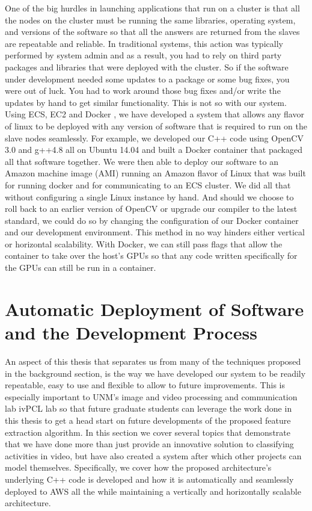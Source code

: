 One of the big hurdles in launching applications that run on a cluster is that
all the nodes on the cluster must be running the same libraries, operating
system,  and versions of the software so that all the answers are returned from
the slaves are repeatable and reliable. In traditional systems, this action was
typically performed by system admin and as a result, you had to rely on third
party packages and libraries that were deployed with the cluster. So if the
software under development needed some updates to a package or some bug fixes,
you were out of luck. You had  to work around those bug fixes and/or write the
updates by hand to get similar  functionality. This is not so with our system.
Using ECS, EC2 and Docker \cite{Merkel:2014:DLL:2600239.2600241}, we  have
developed a system that allows any flavor of linux to be deployed with any
version of software that is required to run on the slave nodes seamlessly. For
example, we developed our C++ code using OpenCV 3.0 and g++4.8 all on Ubuntu
14.04 and built a Docker container that packaged all that software together.
We were then able to deploy our software to an Amazon machine image (AMI) running
an Amazon flavor of Linux that was built for running docker and for communicating
to an ECS cluster. We did all that without configuring a single Linux instance
by hand. And should we choose to roll back to an earlier version of OpenCV or
upgrade our compiler to the latest standard, we could do so by changing the
configuration of our Docker container and our development environment. This
method in no way hinders either vertical or horizontal scalability. With Docker,
we can still pass flags that allow the container to take over the host's GPUs
so that any code written specifically for the GPUs can still be run in a container.


\section{\label{section:auto_deployment}Automatic Deployment of Software and
the Development Process}
An aspect of this thesis that separates us from many of the techniques proposed
in the background section, is the way we have developed our system to be readily
repeatable, easy to use and flexible to allow to future improvements. This is
especially important to UNM's image and video processing and communication lab
ivPCL lab so that future graduate students can leverage the work done in this
thesis to get a head start on future developments of the proposed feature
extraction algorithm. In this section we cover several topics that demonstrate
that we have done more than just provide an innovative solution to classifying
activities in video, but have also created a system after which other projects
can model themselves. Specifically, we cover how the proposed architecture's
underlying C++ code is developed and how it is automatically and seamlessly
deployed to AWS all the while maintaining a vertically and horizontally scalable
architecture.


